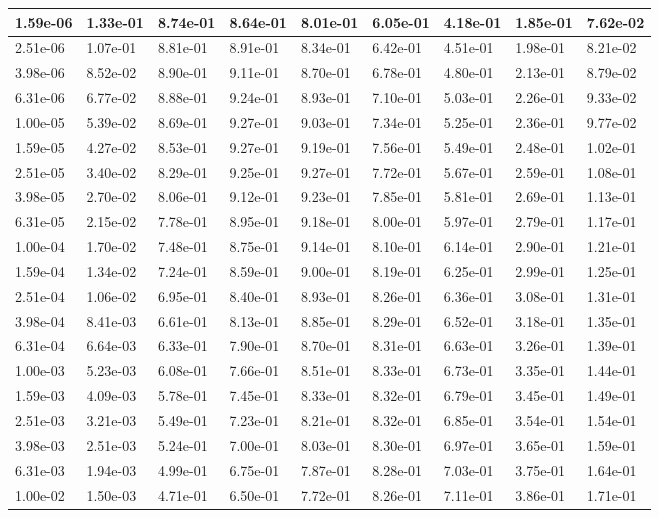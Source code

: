 \documentclass[review]{elsarticle}
\begin{document}
\begin{longtable}{|p{1.6cm}|l|l|l|l|l|l|l|l|}
	1.59e-06&1.33e-01&8.74e-01&8.64e-01&8.01e-01&6.05e-01&4.18e-01&1.85e-01&7.62e-02\\ \hline 
	2.51e-06&1.07e-01&8.81e-01&8.91e-01&8.34e-01&6.42e-01&4.51e-01&1.98e-01&8.21e-02\\ \hline 
	3.98e-06&8.52e-02&8.90e-01&9.11e-01&8.70e-01&6.78e-01&4.80e-01&2.13e-01&8.79e-02\\ \hline 
	6.31e-06&6.77e-02&8.88e-01&9.24e-01&8.93e-01&7.10e-01&5.03e-01&2.26e-01&9.33e-02\\ \hline 
	1.00e-05&5.39e-02&8.69e-01&9.27e-01&9.03e-01&7.34e-01&5.25e-01&2.36e-01&9.77e-02\\ \hline 
	1.59e-05&4.27e-02&8.53e-01&9.27e-01&9.19e-01&7.56e-01&5.49e-01&2.48e-01&1.02e-01\\ \hline 
	2.51e-05&3.40e-02&8.29e-01&9.25e-01&9.27e-01&7.72e-01&5.67e-01&2.59e-01&1.08e-01\\ \hline 
	3.98e-05&2.70e-02&8.06e-01&9.12e-01&9.23e-01&7.85e-01&5.81e-01&2.69e-01&1.13e-01\\ \hline 
	6.31e-05&2.15e-02&7.78e-01&8.95e-01&9.18e-01&8.00e-01&5.97e-01&2.79e-01&1.17e-01\\ \hline 
	1.00e-04&1.70e-02&7.48e-01&8.75e-01&9.14e-01&8.10e-01&6.14e-01&2.90e-01&1.21e-01\\ \hline 
	1.59e-04&1.34e-02&7.24e-01&8.59e-01&9.00e-01&8.19e-01&6.25e-01&2.99e-01&1.25e-01\\ \hline 
	2.51e-04&1.06e-02&6.95e-01&8.40e-01&8.93e-01&8.26e-01&6.36e-01&3.08e-01&1.31e-01\\ \hline 
	3.98e-04&8.41e-03&6.61e-01&8.13e-01&8.85e-01&8.29e-01&6.52e-01&3.18e-01&1.35e-01\\ \hline 
	6.31e-04&6.64e-03&6.33e-01&7.90e-01&8.70e-01&8.31e-01&6.63e-01&3.26e-01&1.39e-01\\ \hline 
	1.00e-03&5.23e-03&6.08e-01&7.66e-01&8.51e-01&8.33e-01&6.73e-01&3.35e-01&1.44e-01\\ \hline 
	1.59e-03&4.09e-03&5.78e-01&7.45e-01&8.33e-01&8.32e-01&6.79e-01&3.45e-01&1.49e-01\\ \hline 
	2.51e-03&3.21e-03&5.49e-01&7.23e-01&8.21e-01&8.32e-01&6.85e-01&3.54e-01&1.54e-01\\ \hline 
	3.98e-03&2.51e-03&5.24e-01&7.00e-01&8.03e-01&8.30e-01&6.97e-01&3.65e-01&1.59e-01\\ \hline 
	6.31e-03&1.94e-03&4.99e-01&6.75e-01&7.87e-01&8.28e-01&7.03e-01&3.75e-01&1.64e-01\\ \hline 
	1.00e-02&1.50e-03&4.71e-01&6.50e-01&7.72e-01&8.26e-01&7.11e-01&3.86e-01&1.71e-01\\ \hline 

\end{longtable}
\end{document}
